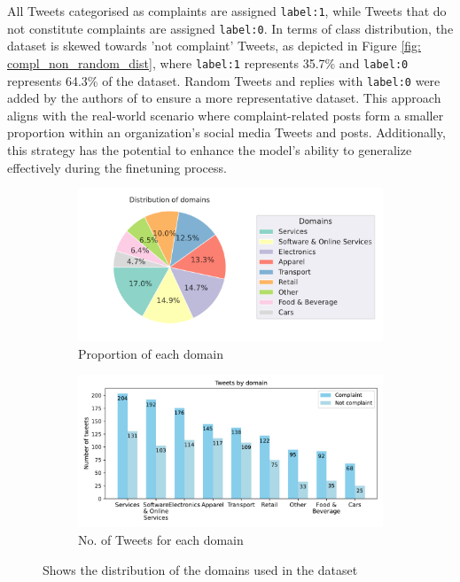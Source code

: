 All Tweets categorised as complaints are assigned \texttt{label:1}, while Tweets that do not constitute complaints are assigned \texttt{label:0}. In terms of class distribution, the dataset is skewed towards 'not complaint' Tweets, as depicted in Figure \ref{fig: compl_non_random_dist}, where \texttt{label:1} represents 35.7\% and \texttt{label:0} represents 64.3\% of the dataset. Random Tweets and replies with \texttt{label:0} were added by the authors of \cite{preotiuc-pietro_automatically_2019} to ensure a more representative dataset. This approach aligns with the real-world scenario where complaint-related posts form a smaller proportion within an organization's social media Tweets and posts. Additionally, this strategy has the potential to enhance the model's ability to generalize effectively during the finetuning process.\\

\begin{figure}[htbp]
    \centering
    \captionsetup{font=small}
    \begin{subfigure}{0.49\textwidth}
        \centering
        \includegraphics[width=\linewidth]{figures/domain_dist.pdf}
        \caption{Proportion of each domain}
        \label{fig: domain_dist_pct}
    \end{subfigure}
    \hfill
    \begin{subfigure}{0.49\textwidth}
        \centering
        \includegraphics[width=\linewidth]{figures/domain_counts_bar_norandom.pdf}
        \caption{No. of Tweets for each domain}
        \label{fig: domain_dist_count}
    \end{subfigure}
    \caption{Shows the distribution of the domains used in the dataset}
    \label{fig: compl_main_dist}
\end{figure}

